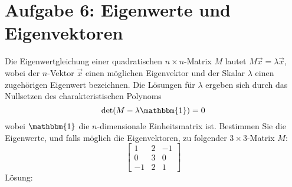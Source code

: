 \section{Aufgabe 6: Eigenwerte und Eigenvektoren}
Die Eigenwertgleichung einer quadratischen $n\times n$-Matrix $M$ lautet $M\overrightarrow{x}=\lambda\overrightarrow{x}$, wobei der $n$-Vektor $\overrightarrow{x}$ einen möglichen Eigenvektor und der Skalar $\lambda$ einen zugehörigen Eigenwert bezeichnen. Die Lösungen für $\lambda$ ergeben sich durch das Nullsetzen des charakteristischen Polynoms
\[\det(M-\lambda\mathbbm{1})=0\]
wobei $\mathbbm{1}$ die $n$-dimensionale Einheitsmatrix ist.  Bestimmen Sie die Eigenwerte, und falls möglich die Eigenvektoren, zu folgender $3\times 3$-Matrix $M$:
\[\begin{bmatrix}
	1 & 2& -1\\
	0 & 3 & 0\\
	-1 & 2 & 1
\end{bmatrix}\]
Lösung:
